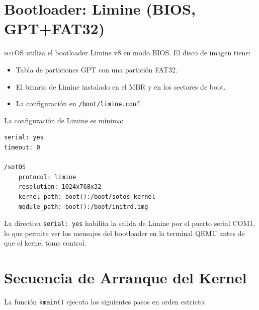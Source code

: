 \documentclass[11pt,twoside,openright]{book}
\theoremstyle{definition}
\theoremstyle{plain}
\theoremstyle{remark}
\newcommand{\sotos}{\textsc{sotOS}}
\begin{document}
\section{Bootloader: Limine (BIOS, GPT+FAT32)}
\label{sec:limine}

\sotos{} utiliza el bootloader Limine v8 en modo BIOS. El disco de imagen tiene:
\begin{itemize}
    \item Tabla de particiones GPT con una partición FAT32.
    \item El binario de Limine instalado en el MBR y en los sectores de boot.
    \item La configuración en \texttt{/boot/limine.conf}.
\end{itemize}

La configuración de Limine es mínima:

\begin{lstlisting}[language={},basicstyle=\ttfamily\small,frame=single,caption={Contenido de \texttt{boot/limine.conf}.},label={lst:limine-conf}]
serial: yes
timeout: 0

/sotOS
    protocol: limine
    resolution: 1024x768x32
    kernel_path: boot():/boot/sotos-kernel
    module_path: boot():/boot/initrd.img
\end{lstlisting}

La directiva \texttt{serial: yes} habilita la salida de Limine por el puerto
serial COM1, lo que permite ver los mensajes del bootloader en la terminal QEMU
antes de que el kernel tome control.

\section{Secuencia de Arranque del Kernel}
\label{sec:boot-sequence}

La función \texttt{kmain()} ejecuta los siguientes pasos en orden estricto:
\end{document}
